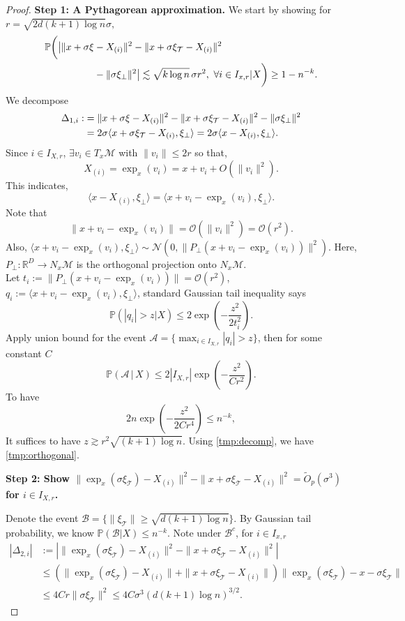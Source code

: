 \documentclass{article}
\def\Prob{{\mathbb P}}
\begin{document}
\begin{proof}
\textbf{Step 1: A Pythagorean approximation.}
We start by showing for $r=\sqrt{2d(k+1)\log n}\sigma,$ 
\begin{align}
\notag
\mathbb{P}\bigg(  \big|\|x + \sigma \xi &- X_{(i)}\|^2 - \|x + \sigma \xi_{\mathcal{T}} - X_{(i)}\|^2\\ &- \|\sigma \xi_\bot\|^2 \big| \lesssim \sqrt{k \log n} \, \sigma r^2,\ 
\forall i \in I_{x,r}|X\bigg) \ge 1 - n^{-k}.
\label{tmp:orthogonal}
\end{align}
We decompose
\begin{align}
\notag
\Delta_{1,i}:&=\|x + \sigma \xi - X_{(i)}\|^2 - \|x + \sigma \xi_{\mathcal{T}} - X_{(i)}\|^2 - \|\sigma \xi_\bot\|^2 \\
\label{tmp:decomp}
&= 2 \sigma \langle x + \sigma \xi_{\mathcal{T}} - X_{(i)}, \xi_\bot \rangle  = 2 \sigma \langle x - X_{(i)}, \xi_\bot \rangle.     
\end{align}
Since $i \in I_{X,r}$, $\exists v_i \in T_x \mathcal{M}$ with $\|v_i\|\leq 2r$ so that,  
\[
X_{(i)} = \exp_x(v_i) = x + v_i + O(\|v_i\|^2).
\]
This indicates, 
\[
\langle x - X_{(i)}, \xi_\bot \rangle = \langle x + v_i - \exp_x(v_i), \xi_\bot \rangle.
\]
Note that
\[
\|x + v_i - \exp_x(v_i)\| = \mathcal{O}(\|v_i\|^2) = \mathcal{O}(r^2).
\]
Also, $\langle x + v_i - \exp_x(v_i), \xi_\bot \rangle \sim \mathcal{N}(0, \|P_\bot(x + v_i - \exp_x(v_i))\|^2)$. Here, $P_\bot: \mathbb{R}^D \to N_x \mathcal{M}$ is the orthogonal projection onto $N_x \mathcal{M}$.\\

Let $t_i := \|P_\bot(x + v_i - \exp_x(v_i))\| = \mathcal{O}(r^2)$, $q_i := \langle x + v_i - \exp_x(v_i), \xi_\bot \rangle$, standard Gaussian tail inequality says
\[
\mathbb{P}(|q_i| > z|X) \le 2 \exp\left( -\frac{z^2}{2 t_i^2} \right).
\]
Apply union bound for the event $\mathcal{A}=\{\max_{i \in I_{X,r}} |q_i| > z\}$, then for some constant $C$
\[
\mathbb{P}\left( \mathcal{A} \,|\,X\right) \leq 2 |I_{X,r}|\exp\left( -\frac{z^2}{C r^2} \right).
\]
To have 
\[
2 n\exp\left( -\frac{z^2}{2 C r^4} \right) \leq n^{-k},
\]
It suffices to have $z \gtrsim r^2 \sqrt{(k+1) \log n}.$ Using \eqref{tmp:decomp}, we have \eqref{tmp:orthogonal}.


\noindent\textbf{Step 2: Show $\|\exp_x(\sigma \xi_{\mathcal{T}})-X_{(i)}\|^2-\|x+\sigma \xi_{\mathcal{T}}-X_{(i)}\|^2=\widetilde{O}_p(\sigma^3)$ for $i\in I_{X,r}$.} 

Denote the event $\mathcal{B}=\{\|\xi_{\mathcal{T}}\|\geq \sqrt{d(k+1)\log n }\}$. By Gaussian tail probability, we know $\Prob(\mathcal{B}|X)\leq n^{-k}$. Note under $\mathcal{B}^c$, for $i\in I_{x,r}$
\begin{align*}
|\Delta_{2,i}|&:=|\|\exp_x(\sigma \xi_{\mathcal{T}})-X_{(i)}\|^2-\|x+\sigma \xi_{\mathcal{T}}-X_{(i)}\|^2|\\
&\leq (\|\exp_x(\sigma \xi_{\mathcal{T}})-X_{(i)}\|+\|x+\sigma \xi_{\mathcal{T}}-X_{(i)}\|)\|\exp_x(\sigma \xi_{\mathcal{T}})-x-\sigma\xi_{\mathcal{T}}\|\\
&\leq 4Cr\|\sigma \xi_{\mathcal{T}}\|^2\leq 4C \sigma^3 (d(k+1)\log n )^{3/2}. 
\end{align*}





\end{proof}
\end{document}
